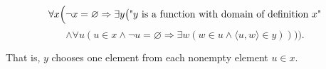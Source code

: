$$\forall x \Bigl(\neg x = \varnothing \Rightarrow \exists y \bigl(\text{"$y$ is a function with domain of definition } x\text{"}$$
$$\wedge \forall u (u \in x \wedge \neg u = \varnothing \Rightarrow \exists w (w \in u \wedge \langle u, w \rangle \in y))\bigr)\Bigr).$$

That is, $y$ chooses one element from each nonempty element $u \in x$.
